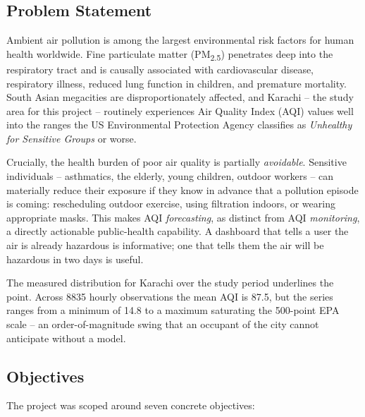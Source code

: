 \documentclass[11pt,a4paper]{article}
\newcommand{\pmfine}{PM\textsubscript{2.5}\xspace}
\begin{document}
\subsection{Problem Statement}

Ambient air pollution is among the largest environmental risk factors for human
health worldwide. Fine particulate matter (\pmfine) penetrates deep into the
respiratory tract and is causally associated with cardiovascular disease,
respiratory illness, reduced lung function in children, and premature
mortality. South Asian megacities are disproportionately affected, and Karachi
-- the study area for this project -- routinely experiences Air Quality Index
(AQI) values well into the ranges the US Environmental Protection Agency
classifies as \emph{Unhealthy for Sensitive Groups} or worse.

Crucially, the health burden of poor air quality is partially
\emph{avoidable}. Sensitive individuals -- asthmatics, the elderly, young
children, outdoor workers -- can materially reduce their exposure if they know
in advance that a pollution episode is coming: rescheduling outdoor exercise,
using filtration indoors, or wearing appropriate masks. This makes AQI
\emph{forecasting}, as distinct from AQI \emph{monitoring}, a directly
actionable public-health capability. A dashboard that tells a user the air is
already hazardous is informative; one that tells them the air will be hazardous
in two days is useful.

The measured distribution for Karachi over the study period underlines the
point. Across \num{8835} hourly observations the mean AQI is 87.5, but the
series ranges from a minimum of 14.8 to a maximum saturating the 500-point EPA
scale -- an order-of-magnitude swing that an occupant of the city cannot
anticipate without a model.

\subsection{Objectives}

The project was scoped around seven concrete objectives:
\end{document}
